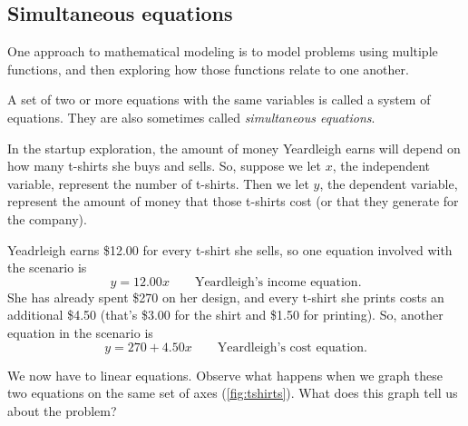 \subsection{Simultaneous equations}

One approach to mathematical modeling is to model problems using multiple functions, and then exploring how those functions relate to one another. 

\begin{boxdef}
A set of two or more equations with the same variables is called a \gls{system of equations}. They are also sometimes called \textit{simultaneous equations}.
\end{boxdef}



In the startup exploration, the amount of money Yeardleigh earns will depend on how many t-shirts she buys and sells. So, suppose we let $x$, the independent variable, represent the number of t-shirts. Then we let $y$, the dependent variable, represent the amount of money that those t-shirts cost (or that they generate for the company).

Yeadrleigh earns \$12.00 for every t-shirt she sells, so one equation involved with the scenario is \[y = 12.00x \qquad\text{Yeardleigh's income equation}.\] She has already spent \$270 on her design, and every t-shirt she prints costs an additional \$4.50 (that's \$3.00 for the shirt and \$1.50 for printing). So, another equation in the scenario is \[y = 270 + 4.50x\qquad\text{Yeardleigh's cost equation}.\]

We now have to linear equations. Observe what happens when we graph these two equations on the same set of axes (\cref{fig:tshirts}). What does this graph tell us about the problem?

